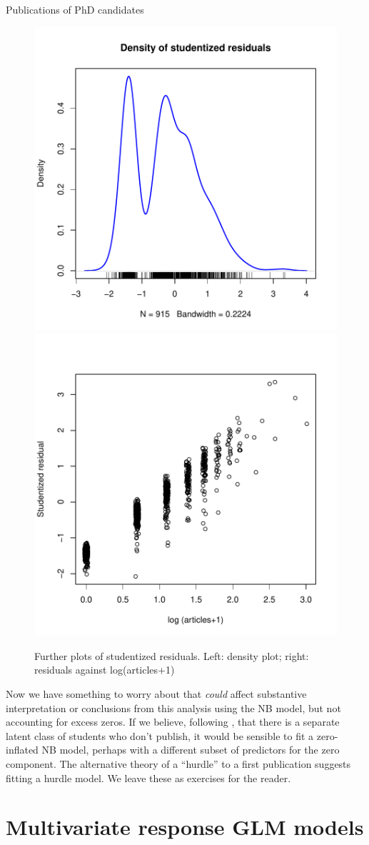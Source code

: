 \documentclass[11pt]{book}\usepackage[]{graphicx}\usepackage[]{color}
\newenvironment{knitrout}{}{} %
\renewenvironment{knitrout}{\small\renewcommand{\baselinestretch}{.85}}{} %
\begin{document}
\begin{Example}[phdpubs6]{Publications of PhD candidates}
\begin{knitrout}
\begin{figure}[!htbp]
\centerline{\includegraphics[width=.5\textwidth]{ch09/fig/phdpubs6-res-plots1} 
\includegraphics[width=.5\textwidth]{ch09/fig/phdpubs6-res-plots2} }

\caption[Further plots of studentized residuals]{Further plots of studentized residuals. Left: density plot; right: residuals against log(articles+1)\label{fig:phdpubs6-res-plots}}
\end{figure}


\end{knitrout}
Now we have something to worry about that \emph{could} affect substantive interpretation or conclusions from this
analysis using the NB model, but not accounting for excess zeros.
If we believe, following \citet{Long:1997}, that there is a separate latent class of students who don't
publish, it would be sensible to fit a zero-inflated NB model, perhaps with a different subset of 
predictors for the zero component.  The alternative theory of a ``hurdle'' to a first publication
suggests fitting a hurdle model.  We leave these as exercises for the reader.

\end{Example}

\section{Multivariate response GLM models}\label{sec:glm-multiv}
\end{document}
